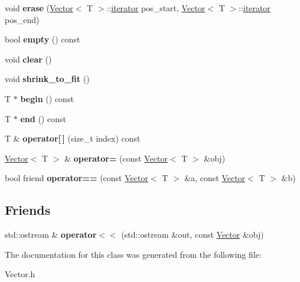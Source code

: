 \begin{DoxyCompactItemize}
\item 
\mbox{\label{class_vector_ace26bf7461e4e951576915ef6ee931fb}} 
void {\bfseries erase} (\mbox{\hyperlink{class_vector}{Vector}}$<$ T $>$\+::\mbox{\hyperlink{class_vector_1_1iterator}{iterator}} pos\+\_\+start, \mbox{\hyperlink{class_vector}{Vector}}$<$ T $>$\+::\mbox{\hyperlink{class_vector_1_1iterator}{iterator}} pos\+\_\+end)
\item 
\mbox{\label{class_vector_ad688a8a0dfbd07ea63d838058a436f79}} 
bool {\bfseries empty} () const
\item 
\mbox{\label{class_vector_a32ad98b135472b0ebc5d6cb3ae5d0085}} 
void {\bfseries clear} ()
\item 
\mbox{\label{class_vector_ad6454ce193263b8000d4c18cb0c3a0c8}} 
void {\bfseries shrink\+\_\+to\+\_\+fit} ()
\item 
\mbox{\label{class_vector_a790b0fff909e8799c059c374ce3762e4}} 
T $\ast$ {\bfseries begin} () const
\item 
\mbox{\label{class_vector_a522d78335b65262c5683a528eb7a18ff}} 
T $\ast$ {\bfseries end} () const
\item 
\mbox{\label{class_vector_a828dd75d60513943d61288352bcc5f7c}} 
T \& {\bfseries operator\mbox{[}$\,$\mbox{]}} (size\+\_\+t index) const
\item 
\mbox{\label{class_vector_aede204cfec16a6294d3c42de619fd675}} 
\mbox{\hyperlink{class_vector}{Vector}}$<$ T $>$ \& {\bfseries operator=} (const \mbox{\hyperlink{class_vector}{Vector}}$<$ T $>$ \&obj)
\item 
\mbox{\label{class_vector_a5d9df8832cd8b28c6a1cf2ef7b7ac969}} 
bool friend {\bfseries operator==} (const \mbox{\hyperlink{class_vector}{Vector}}$<$ T $>$ \&a, const \mbox{\hyperlink{class_vector}{Vector}}$<$ T $>$ \&b)
\end{DoxyCompactItemize}
\subsection*{Friends}
\begin{DoxyCompactItemize}
\item 
\mbox{\label{class_vector_a38c5cafee4a5802273ca532624943294}} 
std\+::ostream \& {\bfseries operator$<$$<$} (std\+::ostream \&out, const \mbox{\hyperlink{class_vector}{Vector}} \&obj)
\end{DoxyCompactItemize}


The documentation for this class was generated from the following file\+:\begin{DoxyCompactItemize}
\item 
Vector.\+h\end{DoxyCompactItemize}
